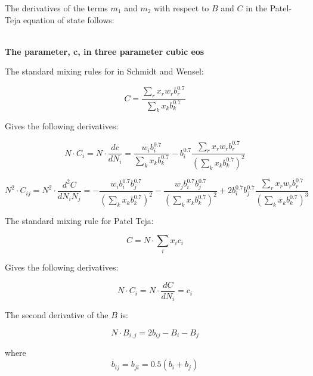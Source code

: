 \documentclass[a4paper, 12pt, english, sintefheadings, sintefcolour]{sintefmemo}
\begin{document}
The derivatives of the terms $m_1$ and $m_2$ with respect to $B$ and $C$ in
the Patel-Teja equation of state follows:


\noindent\hrulefill\\

\textbf{The parameter, c, in three parameter cubic eos}

\noindent\hrulefill

The standard mixing rules for in Schmidt and Wensel:

\begin{equation}
C=\frac{\sum_rx_rw_rb_r^{0.7}}{\sum_kx_kb_k^{0.7}}
\end{equation}

Gives the following derivatives:

\begin{equation}
N\cdot C_i=N\cdot\frac{d c}{d N_i}=\frac{w_ib_i^{0.7}}{\sum_kx_kb_k^{0.7}}-b_i^{0.7}\frac{\sum_rx_rw_rb_r^{0.7}}{\left(\sum_kx_kb_k^{0.7}\right)^2}
\end{equation}

\begin{equation}
N^2\cdot C_{ij}=N^2\cdot\frac{d^2 C}{d N_iN_j}=-\frac{w_ib_i^{0.7}b_j^{0.7}}{\left(\sum_kx_kb_k^{0.7}\right)^{2}}-\frac{w_jb_i^{0.7}b_j^{0.7}}{\left(\sum_kx_kb_k^{0.7}\right)^2}+2b_i^{0.7}b_j^{0.7}\frac{\sum_rx_rw_rb_r^{0.7}}{\left(\sum_kx_kb_k^{0.7}\right)^3}
\end{equation}

\noindent\hrulefill

The standard mixing rule for Patel Teja:

\begin{equation}
C=N\cdot\sum_ix_ic_i
\end{equation}

Gives the following derivatives:

\begin{equation}
N\cdot C_i=N\cdot\frac{d C}{d N_i}=c_i
\end{equation}

The second derivative of the $B$ is:

\begin{equation}
N\cdot B_{i,j} = 2 b_{ij} - B_i - B_j
\end{equation}

where 
\begin{equation}
b_{ij}=b_{ji} = 0.5 \left( b_i + b_j \right)
\end{equation}


\noindent\hrulefill
\end{document}
